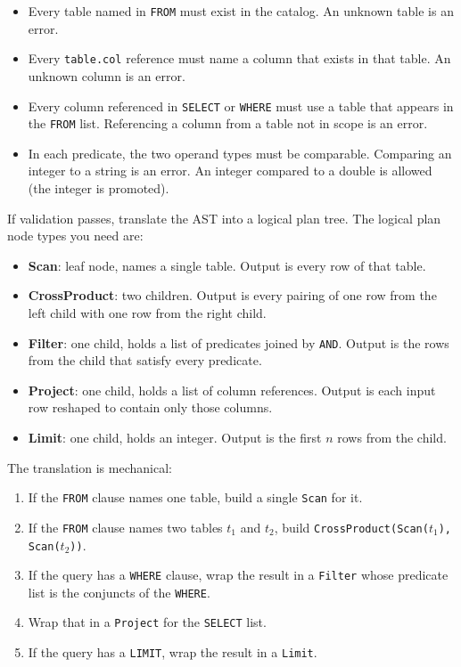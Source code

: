 \documentclass[11pt,a4paper]{article}
\begin{document}
\begin{itemize}
\item Every table named in \texttt{FROM} must exist in the catalog. An unknown table is an error.
\item Every \texttt{table.col} reference must name a column that exists in that table. An unknown column is an error.
\item Every column referenced in \texttt{SELECT} or \texttt{WHERE} must use a table that appears in the \texttt{FROM} list. Referencing a column from a table not in scope is an error.
\item In each predicate, the two operand types must be comparable. Comparing an integer to a string is an error. An integer compared to a double is allowed (the integer is promoted).
\end{itemize}

If validation passes, translate the AST into a logical plan tree. The logical plan node types you need are:

\begin{itemize}
\item \textbf{Scan}: leaf node, names a single table. Output is every row of that table.
\item \textbf{CrossProduct}: two children. Output is every pairing of one row from the left child with one row from the right child.
\item \textbf{Filter}: one child, holds a list of predicates joined by \texttt{AND}. Output is the rows from the child that satisfy every predicate.
\item \textbf{Project}: one child, holds a list of column references. Output is each input row reshaped to contain only those columns.
\item \textbf{Limit}: one child, holds an integer. Output is the first $n$ rows from the child.
\end{itemize}

The translation is mechanical:

\begin{enumerate}
\item If the \texttt{FROM} clause names one table, build a single \texttt{Scan} for it.
\item If the \texttt{FROM} clause names two tables $t_1$ and $t_2$, build \texttt{CrossProduct(Scan($t_1$), Scan($t_2$))}.
\item If the query has a \texttt{WHERE} clause, wrap the result in a \texttt{Filter} whose predicate list is the conjuncts of the \texttt{WHERE}.
\item Wrap that in a \texttt{Project} for the \texttt{SELECT} list.
\item If the query has a \texttt{LIMIT}, wrap the result in a \texttt{Limit}.
\end{enumerate}
\end{document}
